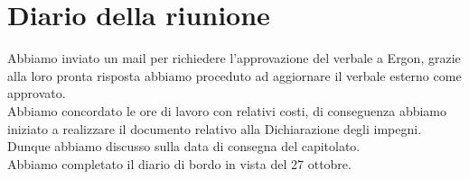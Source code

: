 \section{Diario della riunione}

	Abbiamo inviato un mail per richiedere l'approvazione del verbale a Ergon, grazie alla loro pronta risposta abbiamo proceduto ad aggiornare il verbale esterno come approvato.\\
	Abbiamo concordato le ore di lavoro con relativi costi, di conseguenza abbiamo iniziato a realizzare il documento relativo alla Dichiarazione degli impegni.\\
	Dunque abbiamo discusso sulla data di consegna del capitolato.\\
         Abbiamo completato il diario di bordo in vista del 27 ottobre.\\
	